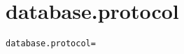 \section{database.protocol}
\label{configuration:DatabaseProtocol}
\AvailableInJavaOnly{\TODO}
\begin{lstlisting}[style=Props,caption={Usage example for \textit{database.protocol}}]
database.protocol=
\end{lstlisting}